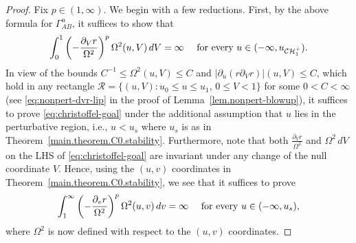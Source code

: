 \documentclass[10pt, reqno]{amsart}
\theoremstyle{definition}
\theoremstyle{remark}
\numberwithin{equation}{section}
\newcommand{\abs}[1]{\vert#1\vert}
\newcommand{\set}[1]{\{#1\}}
\newcommand{\rd}{\partial}
\newcommand{\0}{\emptyset}
\newcommand{\Gmm}{\Gamma}
\newcommand{\Omg}{\Omega}
\newcommand{\calC}{\mathcal C}
\newcommand{\calH}{\mathcal H}
\newcommand{\calR}{\mathcal R}
\newcommand{\f}{\frac}
\newcommand{\CH}{\calC \calH^{+}}		%
\begin{document}
\begin{proof}
Fix $p\in (1,\infty)$. We begin with a few reductions. First, by the above formula for $\Gmm^{u}_{AB}$, it suffices to show that
\begin{equation} \label{eq:christoffel-goal}
	\int_{0}^{1} \left(-\frac{\rd_{V} r}{\Omg^{2}}\right)^{p} \Omg^{2} (u, V) \, d V = \infty \quad \hbox{ for every } u \in (-\infty, u_{\CH_{1}}).
\end{equation}
In view of the bounds $C^{-1} \leq \Omg^{2}(u, V) \leq C$ and $\abs{\rd_{u} (r \rd_{V} r)}(u, V) \leq C$, which hold in any rectangle $\calR = \set{(u, V) : u_{0} \leq u \leq u_{1}, \, 0 \leq V < 1}$ for some $0 < C < \infty$ (see \eqref{eq:nonpert-dvr-lip} in the proof of Lemma~\ref{lem.nonpert-blowup}), it suffices to prove \eqref{eq:christoffel-goal} under the additional assumption that $u$ lies in the perturbative region, i.e., $u < u_{s}$ where $u_{s}$ is as in Theorem~\ref{main.theorem.C0.stability}. Furthermore, note that both 
$\f{\rd_{V} r}{\Omg^{2}}$ and $\Omg^2 \, dV$ on the LHS of \eqref{eq:christoffel-goal} are invariant under any change of the null coordinate $V$. Hence, using the $(u, v)$ coordinates in Theorem~\ref{main.theorem.C0.stability}, we see that it suffices to prove
\begin{equation} \label{eq:christoffel-goal-v}
	\int_{1}^{\infty} \left(-\frac{\rd_{v} r}{\Omg^{2}}\right)^{p} \Omg^{2} (u, v) \, d v = \infty \quad \hbox{ for every } u \in (-\infty, u_{s}), 
\end{equation}
where $\Omg^{2}$ is now defined with respect to the $(u, v)$ coordinates.


\end{proof}
\end{document}
